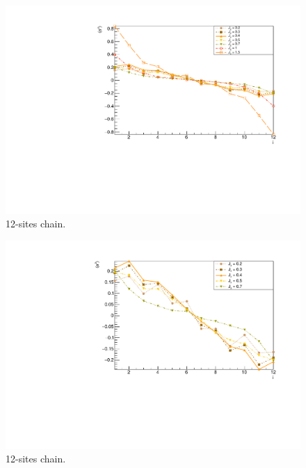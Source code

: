 \begin{figure}[H]
    \centering
    \includegraphics[scale=0.7]{Figures/12sites/12sites_LMvsJz.pdf}
    \caption{12-sites chain.}
    \label{fig:my_label}
\end{figure}

\begin{figure}[H]
    \centering
    \includegraphics[scale=0.7]{Figures/12sites/12sites_LMvsLOWJz.pdf}
    \caption{12-sites chain.}
    \label{fig:my_label}
\end{figure}

